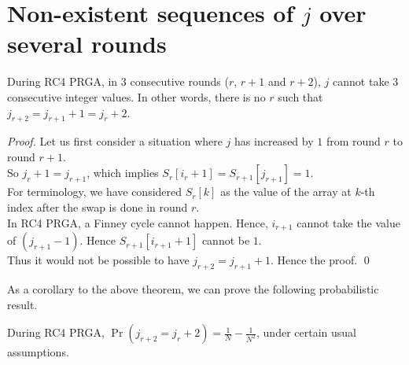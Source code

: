 \documentclass{llncs}
\begin{document}
\section{Non-existent sequences of $j$ over several rounds}

\begin{theorem}

\label{th2}

During RC4 PRGA, in $3$ consecutive rounds ($r$, $r+1$ and $r+2$), $j$ cannot take $3$ consecutive integer values. In other words, there is no $r$ such that $j_{r+2} = j_{r+1} + 1 = j_{r} + 2$.

\end{theorem}

\begin{proof}
Let us first consider a situation where $j$ has increased by $1$ from round $r$ to round $r+1$. \\

So $j_{r} + 1 = j_{r+1}$, which implies $S_{r}[i_{r} + 1] = S_{r+1}[j_{r+1}] = 1$. \\

For terminology, we have considered $S_{r}[k]$ as the value of the array at $k$-th index after the swap is done in round $r$. \\

In RC4 PRGA, a Finney cycle cannot happen. Hence, $i_{r+1}$ cannot take the value of $(j_{r+1} - 1)$. Hence $S_{r+1}[i_{r+1}+1]$ cannot be $1$. \\

Thus it would not be possible to have $j_{r+2} = j_{r+1} + 1$. Hence the proof. \qed

\end{proof}

As a corollary to the above theorem, we can prove the following probabilistic result.

\begin{corollary}

During RC4 PRGA, $\Pr(j_{r+2} = j_{r}+2) = \frac{1}{N} - \frac{1}{N^2}$, under certain usual assumptions.

\end{corollary} 
\end{document}
